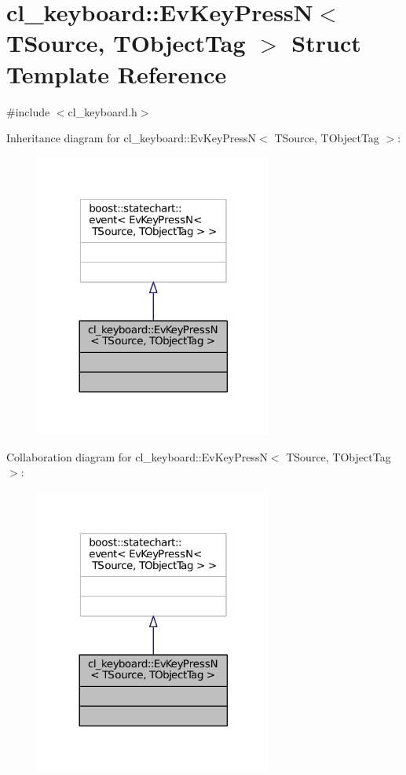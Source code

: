 \hypertarget{structcl__keyboard_1_1EvKeyPressN}{}\section{cl\+\_\+keyboard\+:\+:Ev\+Key\+PressN$<$ T\+Source, T\+Object\+Tag $>$ Struct Template Reference}
\label{structcl__keyboard_1_1EvKeyPressN}


{\ttfamily \#include $<$cl\+\_\+keyboard.\+h$>$}



Inheritance diagram for cl\+\_\+keyboard\+:\+:Ev\+Key\+PressN$<$ T\+Source, T\+Object\+Tag $>$\+:
\nopagebreak
\begin{figure}[H]
\begin{center}
\leavevmode
\includegraphics[width=221pt]{structcl__keyboard_1_1EvKeyPressN__inherit__graph}
\end{center}
\end{figure}


Collaboration diagram for cl\+\_\+keyboard\+:\+:Ev\+Key\+PressN$<$ T\+Source, T\+Object\+Tag $>$\+:
\nopagebreak
\begin{figure}[H]
\begin{center}
\leavevmode
\includegraphics[width=221pt]{structcl__keyboard_1_1EvKeyPressN__coll__graph}
\end{center}
\end{figure}


